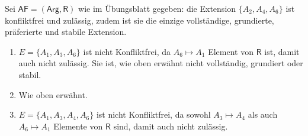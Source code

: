 Sei $\mathsf{AF}=(\mathsf{Arg}, \mathsf{R})$ wie im Übungsblatt gegeben: die Extension $\{A_2, A_4, A_6\}$ ist konfliktfrei und zulässig, zudem ist sie die einzige vollständige, grundierte, präferierte und stabile Extension.

\begin{enumerate}[label=\alph*)]
	\item $E=\{A_1, A_3, A_6\}$ ist nicht Konfliktfrei, da $A_6\mapsto A_1$ Element von $\mathsf{R}$ ist, damit auch nicht zulässig. Sie ist, wie oben erwähnt nicht vollständig, grundiert oder stabil.
	
	\item Wie oben erwähnt.
	
	\item $E=\{A_1, A_3, A_4, A_6\}$ ist nicht Konfliktfrei, da sowohl $A_3\mapsto A_4$ als auch $A_6\mapsto A_1$ Elemente von $\mathsf{R}$ sind, damit auch nicht zulässig.
\end{enumerate}